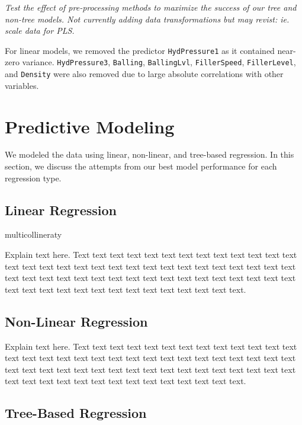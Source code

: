 \documentclass[]{report}
\begin{document}
\emph{Test the effect of pre-processing methods to maximize the success
of our tree and non-tree models. Not currently adding data
transformations but may revist: ie. scale data for PLS. }

For linear models, we removed the predictor \texttt{HydPressure1} as it
contained near-zero variance. \texttt{HydPressure3}, \texttt{Balling},
\texttt{BallingLvl}, \texttt{FillerSpeed}, \texttt{FillerLevel}, and
\texttt{Density} were also removed due to large absolute correlations
with other variables.

\hypertarget{predictive-modeling}{%
\chapter{Predictive Modeling}\label{predictive-modeling}}

We modeled the data using linear, non-linear, and tree-based regression.
In this section, we discuss the attempts from our best model performance
for each regression type.

\hypertarget{linear-regression}{%
\section{Linear Regression}\label{linear-regression}}

multicollineraty

Explain text here. Text text text text text text text text text text
text text text text text text text text text text text text text text
text text text text text text text text text text text text text text
text text text text text text text text text text text text text text
text text text text text text text text text.

\hypertarget{non-linear-regression}{%
\section{Non-Linear Regression}\label{non-linear-regression}}

Explain text here. Text text text text text text text text text text
text text text text text text text text text text text text text text
text text text text text text text text text text text text text text
text text text text text text text text text text text text text text
text text text text text text text text text.

\hypertarget{tree-based-regression}{%
\section{Tree-Based Regression}\label{tree-based-regression}}
\end{document}
